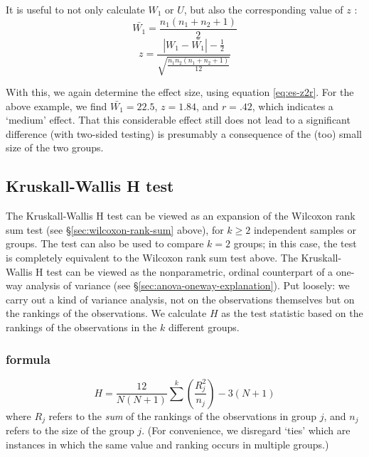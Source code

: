 \documentclass[
]{book}
\begin{document}
It is useful to not only calculate \(W_1\) or \(U\), but also the
corresponding value of \(z\) \citep{Ferg89}:
\begin{equation}
  \label{eq:Wilcoxon-ranksum}
\bar{W_1} = \frac{ n_1 (n_1+n_2+1) }{ 2 }
\end{equation}
\begin{equation}
   \label{eq:Wilcoxon-ranksum-z}
  z = \frac{ |W_1-\bar{W_1}|-\frac{1}{2} }{ \sqrt{ \frac{n_1 n_2 (n_1+n_2+1)}{12} } }
\end{equation}

With this, we again determine the effect size, using equation \eqref{eq:es-z2r}.
For the above example, we find
\(\bar{W_1}=22.5\), \(z=1.84\), and \(r=.42\), which indicates a
`medium' effect. That this considerable effect still does
not lead to a significant difference (with two-sided testing) is presumably
a consequence of the (too) small size of the two groups.

\subsection{Kruskall-Wallis H test}\label{kruskall-wallis-h-test}

The Kruskall-Wallis H test can be viewed as an expansion of the
Wilcoxon rank sum test (see
§\ref{sec:wilcoxon-rank-sum} above), for \(k \ge 2\) independent samples
or groups. The test can also be used to compare \(k=2\) groups;
in this case, the test is completely equivalent to the Wilcoxon rank sum
test above. The Kruskall-Wallis H test can be viewed as the
nonparametric, ordinal counterpart of a one-way analysis of variance
(see §\ref{sec:anova-oneway-explanation}). Put loosely: we carry out a kind of
variance analysis, not on the observations themselves but on the rankings of the
observations. We calculate \(H\) as the test statistic based on the rankings
of the observations in the \(k\) different
groups.

\subsubsection{formula}\label{formula}

\begin{equation}
  \label{eq:kruskall-wallis-H}
    H = \frac{12}{N(N+1)} \sum^{k} (\frac{R^2_j}{n_j}) - 3(N+1)
\end{equation}
where \(R_j\) refers to the \emph{sum} of the rankings of the observations
in group \(j\), and \(n_j\) refers to the size of the group \(j\).
(For convenience, we disregard `ties'
which are instances in which the same value and ranking occurs in
multiple groups.)
\end{document}
